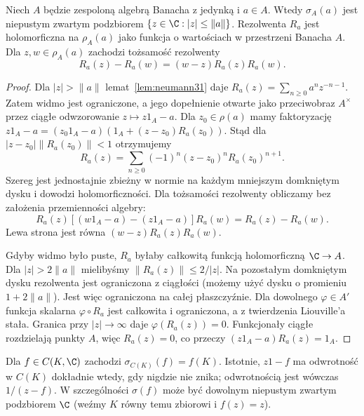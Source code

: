 \begin{twierdzenie}
\label{thm:spectrum-nonempty31}
Niech $A$ będzie zespoloną algebrą Banacha z jedynką i $a\in A$.
Wtedy $\sigma_A(a)$ jest niepustym zwartym podzbiorem
$\{z\in\C:|z|\le\|a\|\}$. Rezolwenta $R_a$ jest holomorficzna
na $\rho_A(a)$ jako funkcja o wartościach w przestrzeni Banacha $A$.
Dla $z,w\in\rho_A(a)$ zachodzi tożsamość rezolwenty
\[
 R_a(z)-R_a(w)=(w-z)R_a(z)R_a(w).
\]
\end{twierdzenie}
\begin{proof}
Dla $|z|>\|a\|$ lemat~\ref{lem:neumann31} daje
$R_a(z)=\sum_{n\ge0}a^n z^{-n-1}$. Zatem widmo jest ograniczone,
a jego dopełnienie otwarte jako przeciwobraz $A^\times$
przez ciągłe odwzorowanie $z\mapsto z1_A-a$.
Dla $z_0\in\rho(a)$ mamy faktoryzację
$z1_A-a=(z_0 1_A-a)(1_A+(z-z_0)R_a(z_0))$.
Stąd dla $|z-z_0|\|R_a(z_0)\|<1$ otrzymujemy
\[
R_a(z)=\sum_{n\ge0}(-1)^n(z-z_0)^n R_a(z_0)^{n+1}.
\]
Szereg jest jednostajnie zbieżny w normie na każdym
mniejszym domkniętym dysku i dowodzi holomorficzności.
Dla tożsamości rezolwenty obliczamy bez założenia przemienności
algebry:
\[
R_a(z)[(w1_A-a)-(z1_A-a)]R_a(w)
=R_a(z)-R_a(w).
\]
Lewa strona jest równa $(w-z)R_a(z)R_a(w)$.

Gdyby widmo było puste, $R_a$ byłaby całkowitą funkcją holomorficzną
$\C\to A$. Dla $|z|>2\|a\|$ mielibyśmy
$\|R_a(z)\|\le 2/|z|$. Na pozostałym domkniętym dysku rezolwenta jest ograniczona
z ciągłości (możemy użyć dysku o promieniu $1+2\|a\|$).
Jest więc ograniczona na całej płaszczyźnie.
Dla dowolnego $\varphi\in A'$ funkcja skalarna
$\varphi\circ R_a$ jest całkowita i ograniczona, a z twierdzenia
Liouville'a stała. Granica przy $|z|\to\infty$ daje
$\varphi(R_a(z))=0$. Funkcjonały ciągłe rozdzielają punkty $A$,
więc $R_a(z)=0$, co przeczy $(z1_A-a)R_a(z)=1_A$.
\end{proof}

\begin{przyklad}
\label{ex:multiplication-spectrum31}
Dla $f\in C(K,\C)$ zachodzi $\sigma_{C(K)}(f)=f(K)$.
Istotnie, $z1-f$ ma odwrotność w $C(K)$ dokładnie wtedy,
gdy nigdzie nie znika; odwrotnością jest wówczas $1/(z-f)$.
W szczególności $\sigma(f)$ może być dowolnym niepustym zwartym
podzbiorem $\C$ (weźmy $K$ równy temu zbiorowi i $f(z)=z$).
\end{przyklad}

